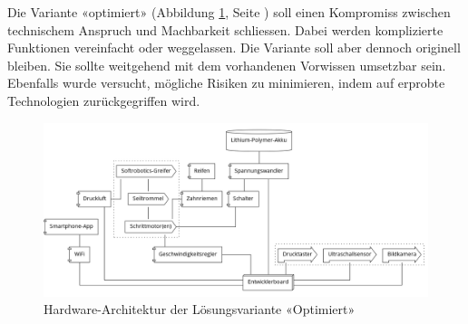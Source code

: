 \documentclass[a4paper,11pt]{scrartcl}
\begin{document}
Die Variante «optimiert» (Abbildung \ref{fig:optimiert}, Seite \pageref{fig:optimiert}) soll einen Kompromiss zwischen technischem Anspruch und Machbarkeit schliessen. Dabei werden komplizierte Funktionen vereinfacht oder weggelassen. Die Variante soll aber dennoch originell bleiben. Sie sollte weitgehend mit dem vorhandenen Vorwissen umsetzbar sein. Ebenfalls wurde versucht, mögliche Risiken zu minimieren, indem auf erprobte Technologien zurückgegriffen wird.

\begin{figure}[H]
    \includegraphics[width=\linewidth]{optimiert.png}
    \caption{Hardware-Architektur der Lösungsvariante «Optimiert»}
    \label{fig:optimiert}
\end{figure}
\end{document}

